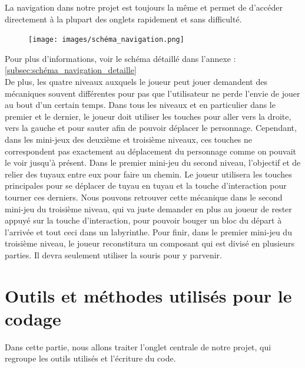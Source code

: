 \documentclass[12pt,a4paper]{article}
\begin{document}
            \newpage

            \tabto{1cm} La navigation dans notre projet est toujours la même et permet de d'accéder directement à la plupart des onglets rapidement et sans difficulté.\\

            \begin{figure}[h]
                \centering
                \texttt{[image: images/schéma\_navigation.png]}\\
            \end{figure}

            Pour plus d'informations, voir le schéma détaillé dans l'annexe : \ref{subsec:schéma_navigation_detaille}\\

            \tabto{1cm} De plus, les quatre niveaux auxquels le joueur peut jouer demandent des mécaniques souvent différentes pour pas que l’utilisateur ne perde l’envie de jouer au bout d’un certain temps. Dans tous les niveaux et en particulier dans le premier et le dernier, le joueur doit utiliser les touches pour aller vers la droite, vers la gauche et pour sauter afin de pouvoir déplacer le personnage. Cependant, dans les mini-jeux des deuxième et troisième niveaux, ces touches ne correspondent pas exactement au déplacement du personnage comme on pouvait le voir jusqu’à présent. Dans le premier mini-jeu du second niveau, l’objectif et de relier des tuyaux entre eux pour faire un chemin. Le joueur utilisera les touches principales pour se déplacer de tuyau en tuyau et la touche d’interaction pour tourner ces derniers. Nous pouvons retrouver cette mécanique dans le second mini-jeu du troisième niveau, qui va juste demander en plus au joueur de rester appuyé sur la touche d’interaction, pour pouvoir bouger un bloc du départ à l’arrivée et tout ceci dans un labyrinthe. Pour finir, dans le premier mini-jeu du troisième niveau, le joueur reconstitura un composant qui est divisé en plusieurs parties. Il devra seulement utiliser la souris pour y parvenir.\\
 
    \newpage

    \section{Outils et méthodes utilisés pour le codage}
        \tabto{1cm} Dans cette partie, nous allons traiter l'onglet centrale de notre projet, qui regroupe les outils utilisés et l'écriture du code.
\end{document}
